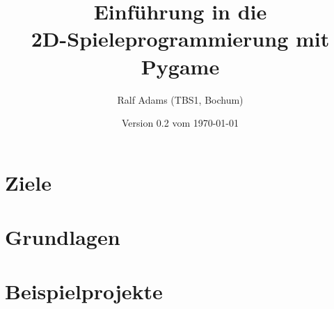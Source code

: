\documentclass[a4paper,12pt,oneside]{scrreprt}
\begin{document}
  \title{Einführung in die\\2D-Spieleprogrammierung mit Pygame}
  \author{Ralf Adams (TBS1, Bochum)}
  \date{Version 0.2 vom \today}
  \maketitle
  \tableofcontents

\setlength{\parindent}{0.0em}
\setlength{\parskip}{1.0ex plus0.5ex minus0.5ex}
\setlength{\itemsep}{-0.3ex plus0.2ex}


\chapter{Ziele}
\chapter{Grundlagen}\label{secGrundlagen}











\chapter{Beispielprojekte}


\listoffigures
\lstlistoflistings

\printglossaries
\printindex
{}
\end{document}
